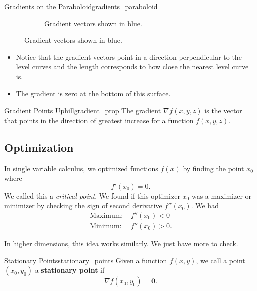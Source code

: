 \begin{ex}{Gradients on the Paraboloid}{gradients_paraboloid}
\begin{figure}[H]
\begin{subfigure}[h]{.45\textwidth}
                            \caption{Gradient vectors shown in blue.}
                            \end{subfigure}
                        \end{figure}
                        \begin{itemize}
                            \item Notice that the gradient vectors point in a direction perpendicular to the level curves and the length corresponds to how close the nearest level curve is.
                            \item The gradient is zero at the bottom of this surface.
                        \end{itemize}
                        \end{ex}

                        \begin{prop}{Gradient Points Uphill}{gradient_prop}
                        The gradient $\nabla f(x,y,z)$ is the vector that points in the direction of greatest increase for a function $f(x,y,z)$.
                        \end{prop}

\subsection{Optimization}
                        In single variable calculus, we optimized functions $f(x)$ by finding the point $x_0$ where
                        \[
                        f'(x_0)=0.
                        \]
                        We called this a \emph{critical point}. We found if this optimizer $x_0$ was a maximizer or minimizer by checking the sign of second derivative $f''(x_0)$. We had
                        \begin{align*}
                            \textrm{Maximum: }& f''(x_0)<0\\
                            \textrm{Minimum: }& f''(x_0)>0.
                        \end{align*}

                        In higher dimensions, this idea works similarly. We just have more to check.

                        \begin{df}{Stationary Points}{stationary_points}
                        Given a function $f(x,y)$, we call a point $(x_0,y_0)$ a \textbf{stationary point} if
                        \[
                        \nabla f(x_0,y_0) = \mathbf{0}.
                        \]
                        \end{df}

